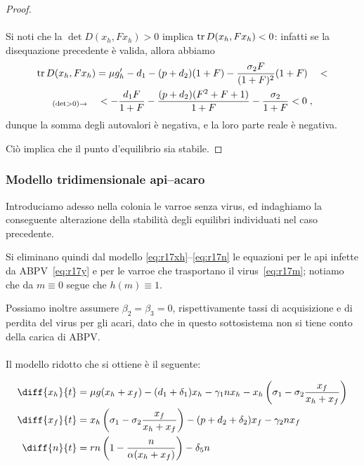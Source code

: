 \begin{proof}
\paragraph{}
Si noti che la $\det D(x_h, F x_h) > 0$ implica $\operatorname{tr} D(x_h, F x_h) <0$: infatti se la disequazione
precedente è valida, allora abbiamo
\begin{multline*}
\operatorname{tr} D(x_h, F x_h) = \mu g_h' -d_1 -(p+d_2)(1+F) - \frac{\sigma_2 F}{(1+F)^2} (1+F)
\quad < \\
 _{(\det >0) \rightarrow} \quad
< - \frac{d_1 F}{1+F} - \frac{(p +d_2) (F^2 +F+1)}{1+F} - \frac{\sigma_2}{1+F} < 0 \; ,
\end{multline*}
dunque la somma degli autovalori è negativa, e la loro parte reale è negativa.

Ciò implica che il punto d'equilibrio sia stabile.
\end{proof}


\subsubsection{Modello tridimensionale api--acaro}
Introduciamo adesso nella colonia le varroe senza virus, ed indaghiamo la conseguente alterazione della stabilità degli equilibri individuati nel caso precedente.

Si eliminano quindi dal modello \eqref{eq:r17xh}--\eqref{eq:r17n} le equazioni per le api infette
da ABPV~\eqref{eq:r17y} e per le varroe che trasportano il virus~\eqref{eq:r17m};
notiamo che da $m \equiv 0$ segue che $h(m) \equiv 1$.

Possiamo inoltre assumere $\beta_2 = \beta_3 = 0$, rispettivamente tassi di acquisizione e di perdita
del virus per gli acari, dato che in questo sottosistema non si tiene conto della carica di ABPV.

\paragraph{}
Il modello ridotto che si ottiene è il seguente:

\begin{align}
    \diff{x_h}{t} &= \mu g( x_h + x_f ) - (d_1 + \delta_1) x_h - \gamma_1 n x_h
        - x_h \left( \sigma_1 - \sigma_2 \frac{x_f}{x_h + x_f} \right)
        \label{eq:rattiRidotto2prima}
    \\
    \diff{x_f}{t} &= x_h \left( \sigma_1 - \sigma_2 \frac{x_f}{x_h + x_f} \right) - (p + d_2 + \delta_2) x_f
        - \gamma_2 n x_f
        \label{eq:rattiRidotto2seconda}
    \\
    \diff{n}{t} &= rn \left( 1 - \frac{n}{ \alpha (x_h + x_f) } \right) - \delta_5 n
        \label{eq:rattiRidotto2terza}
\end{align}

